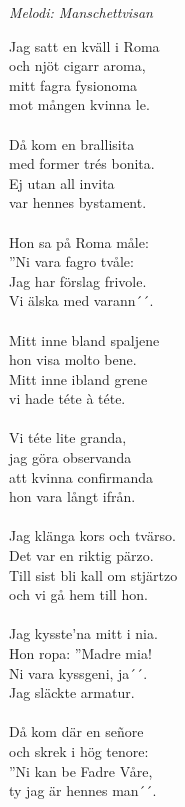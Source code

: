 {\footnotesize\textit{Melodi: Manschettvisan}}\par
\vspace{10pt}
Jag satt en kväll i Roma\\
och njöt cigarr aroma,\\
mitt fagra fysionoma\\
mot mången kvinna le.\\
\\
Då kom en brallisita\\
med former trés bonita.\\
Ej utan all invita\\
var hennes bystament.\\
\\
Hon sa på Roma måle:\\
''Ni vara fagro tvåle:\\
Jag har förslag frivole.\\
Vi älska med varann´´.\\
\\
Mitt inne bland spaljene\\
hon visa molto bene.\\
Mitt inne ibland grene\\
vi hade téte à téte.\\
\\
Vi téte lite granda,\\
jag göra observanda\\
att kvinna confirmanda\\
hon vara långt ifrån.\\
\\
Jag klänga kors och tvärso.\\
Det var en riktig pärzo.\\
Till sist bli kall om stjärtzo\\
och vi gå hem till hon.\\
\\
Jag kysste'na mitt i nia.\\
Hon ropa: ''Madre mia!\\
Ni vara kyssgeni, ja´´.\\
Jag släckte armatur.\\
\\
Då kom där en señore\\
och skrek i hög tenore:\\
''Ni kan be Fadre Våre,\\
ty jag är hennes man´´.\\
\\
